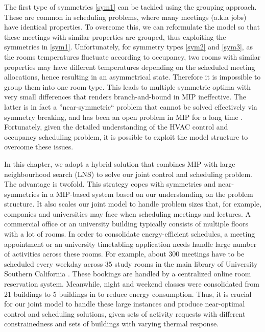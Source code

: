 The first type of symmetries \eqref{sym1} can be tackled using the grouping approach. These are common in scheduling problems, where many meetings (a.k.a jobs) have identical properties. To overcome this, we can reformulate the model so that these meetings with similar properties are grouped, thus exploiting the symmetries in \eqref{sym1}. Unfortunately, for symmetry types \eqref{sym2} and \eqref{sym3}, as the rooms temperatures fluctuate according to occupancy, two rooms with similar properties may have different temperatures depending on the scheduled meeting allocations, hence resulting in an asymmetrical state. Therefore it is impossible to group them into one room type. This leads to multiple symmetric optima with very small differences that renders branch-and-bound in MIP ineffective. The latter is in fact a ''near-symmetric`` problem that cannot be solved effectively via symmetry breaking, and has been an open problem in MIP for a long time \citep{ostrowski2010symmetry}. Fortunately, given the detailed understanding of the HVAC control and occupancy scheduling problem, it is possible to exploit the model structure to overcome these issues. 

In this chapter, we adopt a hybrid solution that combines MIP with large neighbourhood search (LNS) to solve our joint control and scheduling problem. The advantage is twofold. This strategy copes with symmetries and near-symmetries in a MIP-based system based on our understanding on the problem structure. It also scales our joint model to handle problem sizes that, for example, companies and universities may face when scheduling meetings and lectures. A commercial office or an university building typically consists of multiple floors with a lot of rooms. In order to consolidate energy-efficient schedules, a meeting appointment or an university timetabling application needs handle large number of activities across these rooms. For example, about 300 meetings have to be scheduled every weekday across 35 study rooms in the main library of University Southern California \citep{kwak2013tesla}. These bookings are handled by a centralized online room reservation system. Meanwhile, night and weekend classes were consolidated from 21 buildings to 5 buildings in \cite{portland:2012} to reduce energy consumption. Thus, it is crucial for our joint model to handle these large instances and produce near-optimal control and scheduling solutions, given sets of activity requests with different constrainedness and sets of buildings with varying thermal response.

